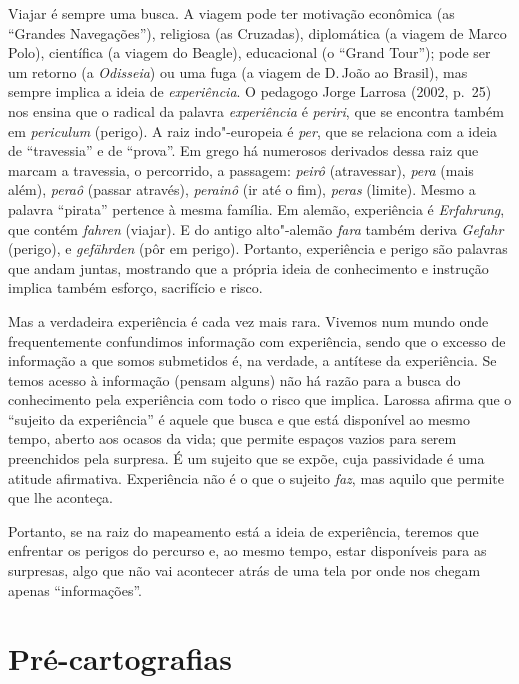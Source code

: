Viajar é sempre uma busca. A viagem pode ter motivação econômica (as
``Grandes Navegações''), religiosa (as Cruzadas), diplomática (a viagem
de Marco Polo), científica (a viagem do Beagle), educacional (o ``Grand
Tour''); pode ser um retorno (a \emph{Odisseia}) ou uma fuga (a viagem de D.\,João  ao Brasil), mas sempre implica a ideia de \emph{experiência}. O
pedagogo Jorge Larrosa (2002, p.~25) nos ensina que o radical da palavra
\emph{experiência} é \emph{periri}, que se encontra também em
\emph{periculum} (perigo). A raiz indo"-europeia é \emph{per}, que se
relaciona com a ideia de ``travessia'' e de ``prova''. Em grego há
numerosos derivados dessa raiz que marcam a travessia, o percorrido, a
passagem: \emph{peirô} (atravessar), \emph{pera} (mais além),
\emph{peraô} (passar através), \emph{perainô} (ir até o fim),
\emph{peras} (limite). Mesmo a palavra ``pirata'' pertence à mesma
família. Em alemão, experiência é \emph{Erfahrung}, que contém
\emph{fahren} (viajar). E do antigo alto"-alemão \emph{fara} também
deriva \emph{Gefahr} (perigo), e \emph{gefährden} (pôr em perigo).
Portanto, experiência e perigo são palavras que andam juntas, mostrando
que a própria ideia de conhecimento e instrução implica também
esforço, sacrifício e risco.

Mas a verdadeira experiência é cada vez mais rara. Vivemos num mundo
onde frequentemente confundimos informação com experiência, sendo que o
excesso de informação a que somos submetidos é, na verdade, a antítese
da experiência. Se temos acesso à informação (pensam alguns) não há razão para a busca do conhecimento pela experiência com todo o risco que implica. Larossa afirma que o ``sujeito da experiência'' é aquele
que busca e que está disponível ao mesmo tempo, aberto aos ocasos da
vida; que permite espaços vazios para serem preenchidos pela surpresa. É
um sujeito que se expõe, cuja passividade é uma atitude afirmativa.
Experiência não é o que o sujeito \emph{faz}, mas aquilo que permite que
lhe aconteça.

Portanto, se na raiz do mapeamento está a ideia de experiência, teremos
que enfrentar os perigos do percurso e, ao mesmo tempo, estar
disponíveis para as surpresas, algo que não vai acontecer atrás de uma
tela por onde nos chegam apenas ``informações''.

\chapter{Pré-cartografias}

